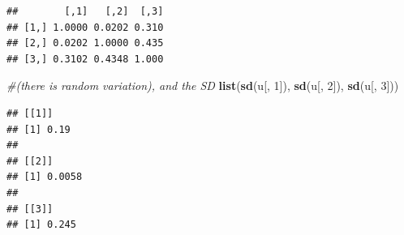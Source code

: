 \documentclass[12pt,]{krantz}
\newenvironment{Shaded}{\begin{snugshade}}{\end{snugshade}}
\newcommand{\KeywordTok}[1]{\textcolor[rgb]{0.13,0.29,0.53}{\textbf{#1}}}
\newcommand{\DataTypeTok}[1]{\textcolor[rgb]{0.13,0.29,0.53}{#1}}
\newcommand{\DecValTok}[1]{\textcolor[rgb]{0.00,0.00,0.81}{#1}}
\newcommand{\StringTok}[1]{\textcolor[rgb]{0.31,0.60,0.02}{#1}}
\newcommand{\CommentTok}[1]{\textcolor[rgb]{0.56,0.35,0.01}{\textit{#1}}}
\newcommand{\OperatorTok}[1]{\textcolor[rgb]{0.81,0.36,0.00}{\textbf{#1}}}
\newcommand{\NormalTok}[1]{#1}
\theoremstyle{definition}
\theoremstyle{definition}
\theoremstyle{definition}
\theoremstyle{remark}
\begin{document}
\begin{Shaded}
\end{Shaded}

\begin{verbatim}
##        [,1]   [,2]  [,3]
## [1,] 1.0000 0.0202 0.310
## [2,] 0.0202 1.0000 0.435
## [3,] 0.3102 0.4348 1.000
\end{verbatim}

\begin{Shaded}
\begin{Highlighting}[]
\CommentTok{#(there is random variation), and the SD}
\KeywordTok{list}\NormalTok{(}\KeywordTok{sd}\NormalTok{(u[, }\DecValTok{1}\NormalTok{]), }\KeywordTok{sd}\NormalTok{(u[, }\DecValTok{2}\NormalTok{]), }\KeywordTok{sd}\NormalTok{(u[, }\DecValTok{3}\NormalTok{]))}
\end{Highlighting}
\end{Shaded}

\begin{verbatim}
## [[1]]
## [1] 0.19
## 
## [[2]]
## [1] 0.0058
## 
## [[3]]
## [1] 0.245
\end{verbatim}
\end{document}

